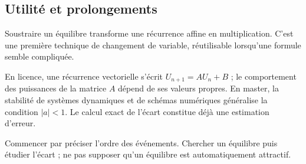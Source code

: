 \documentclass[../cours_1re.tex]{subfiles}
\begin{document}
\begin{finchapitre}
\section{Utilité et prolongements}
Soustraire un équilibre transforme une récurrence affine en multiplication. C'est une première technique de changement de variable, réutilisable lorsqu'une formule semble compliquée.

En licence, une récurrence vectorielle s'écrit $U_{n+1}=AU_n+B$ ; le comportement des puissances de la matrice $A$ dépend de ses valeurs propres. En master, la stabilité de systèmes dynamiques et de schémas numériques généralise la condition $|a|<1$. Le calcul exact de l'écart constitue déjà une estimation d'erreur.
\begin{retenir}
Commencer par préciser l'ordre des événements. Chercher un équilibre puis étudier l'écart ; ne pas supposer qu'un équilibre est automatiquement attractif.
\end{retenir}
\end{finchapitre}
\end{document}
